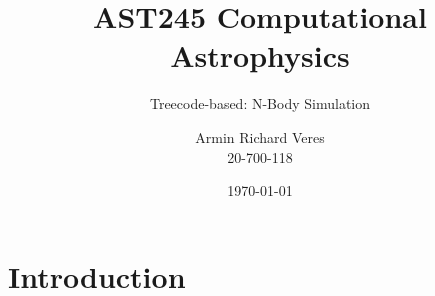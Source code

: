 \documentclass[
	9pt, %
]{beamer}
\title[AST245]{AST245 Computational Astrophysics} %
\subtitle{Treecode-based: N-Body Simulation} %
\author[Armin R. Veres]{Armin Richard Veres\\ 20-700-118} %
\date{\today} %
\begin{document}

\begin{frame}
	\titlepage %
\end{frame}



\begin{frame}
	\tableofcontents %
\end{frame}


\section{Introduction} %
\end{document}
